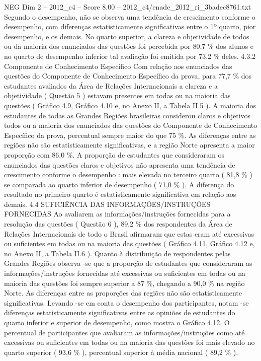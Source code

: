 \begin{textsample}{NEG Dim 2 – 2012\_c4 – Score 8.00 – 2012\_c4/enade\_2012\_ri\_3badec8761.txt}
Segundo o desempenho, não se observa uma tendência de crescimento conforme o desempenho, com diferenças estatisticamente significativas entre o 1º quarto, pior desempenho, e os demais.
No quarto superior, a clareza e objetividade de todos ou da maioria dos enunciados das questões foi percebida por 80,7 \% dos alunos e no quarto de desempenho inferior tal avaliação foi emitida por 73,2 \% deles. 4.3.2 Componente de Conhecimento Específico Com relação aos enunciados das questões do Componente de Conhecimento Específico da prova, para 77,7 \% dos estudantes avaliados da Área de Relações Internacionais a clareza e a objetividade ( Questão 5 ) estavam presentes em todas ou na maioria das questões ( Gráfico 4.9, Gráfico 4.10 e, no Anexo II, a Tabela II.5 ).
A maioria dos estudantes de todas as Grandes Regiões brasileiras considerou claros e objetivos todos ou a maioria dos enunciados das questões do Componente de Conhecimento Específico da prova, percentual sempre maior do que 75 \%.
As diferenças entre as regiões não são estatisticamente significativas, e a região Norte apresenta a maior proporção com 86,0 \%.
A proporção de estudantes que consideraram os enunciados das questões claros e objetivos não apresenta uma tendência de crescimento conforme o desempenho : mais elevada no terceiro quarto ( 81,8 \% ) se comparada ao quarto inferior de desempenho ( 71,0 \% ).
A diferença do resultado no primeiro quarto é estatisticamente significativa em relação aos demais. 4.4 SUFICIÊNCIA DAS INFORMAÇÕES/INSTRUÇÕES FORNECIDAS Ao avaliarem as informações/instruções fornecidas para a resolução das questões ( Questão 6 ), 89,2 \% dos respondentes da Área de Relações Internacionais de todo o Brasil afirmaram que estas eram até excessivas ou suficientes em todas ou na maioria das questões ( Gráfico 4.11, Gráfico 4.12 e, no Anexo II, a Tabela II.6 ).
Quanto à distribuição de respondentes pelas Grandes Regiões observa -se que a proporção de estudantes que consideraram as informações/instruções fornecidas até excessivas ou suficientes em todas ou na maioria das questões foi sempre superior a 87 \%, chegando a 90,0 \% na região Norte.
As diferenças entre as proporções das regiões não são estatisticamente significativas.
Levando -se em conta o desempenho dos participantes, notam -se diferenças estatisticamente significativas entre as opiniões de estudantes do quarto inferior e superior de desempenho, como mostra o Gráfico 4.12.
O percentual de participantes que avaliaram as informações/instruções como até excessivas ou suficientes em todas ou na maioria das questões foi mais elevado no quarto superior ( 93,6 \% ), percentual superior à média nacional ( 89,2 \% ).

\end{textsample}
